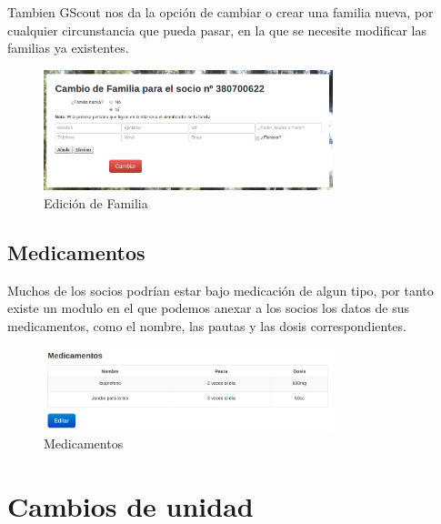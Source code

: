 Tambien GScout nos da la opción de cambiar o crear una familia nueva, por cualquier circunstancia que pueda pasar, en la que se necesite modificar las familias ya existentes.\\

\begin{figure}[H]
\begin{center}
\includegraphics[width=0.75\textwidth]{images/cambio_familia.jpg}
\caption{Edición de Familia}
\label{fig:ArbolBinario}
\end{center}
\end{figure}


\subsection{Medicamentos}

Muchos de los socios podrían estar bajo medicación de algun tipo, por tanto existe un modulo en el que podemos anexar a los socios los datos de sus medicamentos, como el nombre, las pautas y las dosis correspondientes.\\

\begin{figure}[H]
\begin{center}
\includegraphics[width=0.75\textwidth]{images/medicamentos.jpg}
\caption{Medicamentos}
\label{fig:ArbolBinario}
\end{center}
\end{figure}

\section{Cambios de unidad}
\label{3:sec3}

